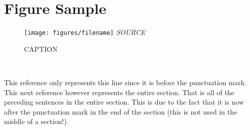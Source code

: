 \section{Figure Sample}

\begin{figure}[H]
	\flushleft 
	\caption{CAPTION}
	\centering
	\texttt{[image: figures/filename]}
	\label{LABEL}
	\flushleft
	\textit{SOURCE}
\end{figure}


\noindent
{}\\

\noindent
{}

\vspace{.5cm}

This reference only represents this line since it is before the punctuation mark\cite{YDing}. This next reference however represents the entire section. That is all of the preceding sentences in the entire section. This is due to the fact that it is now after the punctuation mark in the end of the section (this is not used in the middle of a section!).\cite{YDing}
\pagebreak